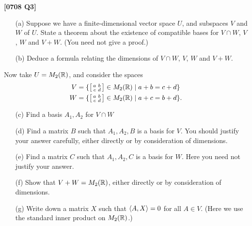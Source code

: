 \documentclass[a4paper]{article}
\begin{document}
\begin{problem}\textbf{[0708 Q3]}
 \begin{itemize}
  \item[(a)] Suppose we have a finite-dimensional vector space $U$,
   and subspaces $V$ and $W$ of $U$.  State a theorem about the
   existence of compatible bases for $V\cap W$, $V$, $W$ and $V+W$.
   (You need not give a proof.)  
  \item[(b)] Deduce a formula relating the dimensions of $V\cap W$,
   $V$, $W$ and $V+W$. 
 \end{itemize}
 Now take $U=M_2({\mathbb{R}})$, and consider the spaces
 \begin{align*}
  V &= \{\left[\begin{smallmatrix} a&b \\ c&d \end{smallmatrix}\right]\in M_2({\mathbb{R}}) \;|\; a+b=c+d \} \\
  W &= \{\left[\begin{smallmatrix} a&b \\ c&d \end{smallmatrix}\right]\in M_2({\mathbb{R}}) \;|\; a+c=b+d \}.
 \end{align*}
 \begin{itemize}
  \item[(c)] Find a basis $A_1,A_2$ for $V\cap W$ 
  \item[(d)] Find a matrix $B$ such that $A_1,A_2,B$ is a basis for
   $V$.  You should justify your answer carefully, either directly or by
   consideration of dimensions.  
  \item[(e)] Find a matrix $C$ such that $A_1,A_2,C$ is a basis for
   $W$.  Here you need not justify your answer. 
  \item[(f)] Show that $V+W=M_2({\mathbb{R}})$, either directly or by
   consideration of dimensions.  
  \item[(g)] Write down a matrix $X$ such that $\langle A,X\rangle=0$ for all
   $A\in V$. (Here we use the standard inner product on $M_2({\mathbb{R}})$.)
 \end{itemize}
\end{problem}
\end{document}
